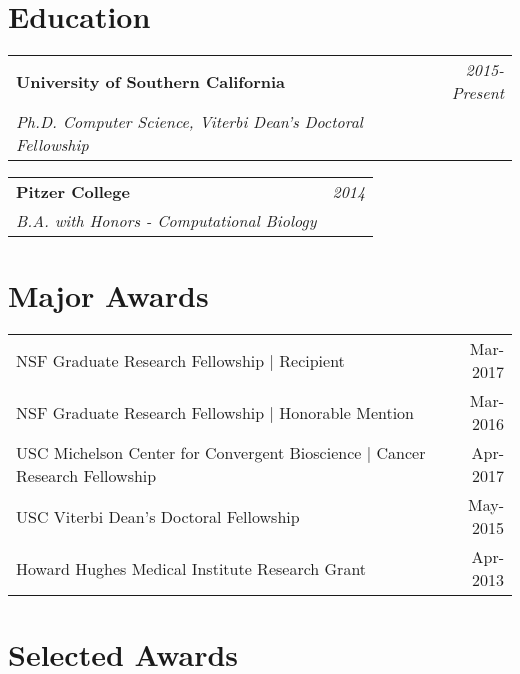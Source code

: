 \documentclass[10pt,a4paper]{article}
\begin{document}
  \newpage

  \vspace*{-15mm}\section*{Education}

  \vspace*{0mm}\noindent\begin{tabularx}{17cm}{X r}
    \textbf{University of Southern California} & \textit{2015-Present} \\
    \textit{Ph.D. Computer Science, Viterbi Dean's Doctoral Fellowship}
  \end{tabularx} 

  \vspace*{1mm}\noindent\begin{tabularx}{17cm}{X r}
    \textbf{Pitzer College} & \textit{2014} \\
    \textit{B.A. with Honors - Computational Biology}
  \end{tabularx}

  \vspace*{2mm}\section*{Major Awards}
  \vspace*{1mm}\noindent\begin{tabularx}{17cm}{X r}
    NSF Graduate Research Fellowship | Recipient & Mar-2017 \\
    NSF Graduate Research Fellowship | Honorable Mention & Mar-2016 \\
    USC Michelson Center for Convergent Bioscience | Cancer Research Fellowship & Apr-2017 \\ %
    USC Viterbi Dean's Doctoral Fellowship & May-2015 \\
    Howard Hughes Medical Institute Research Grant & Apr-2013
  \end{tabularx}

  \vspace*{2mm}\section*{Selected Awards}
  
\end{document}
